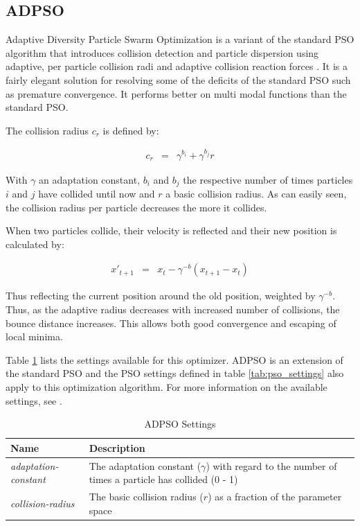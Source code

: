 \documentclass{report}
\begin{document}
\subsection{ADPSO}
Adaptive Diversity Particle Swarm Optimization is a variant of the standard
PSO algorithm that introduces collision detection and particle dispersion
using adaptive, per particle collision radi and adaptive collision reaction
forces \cite{monson_ad_2006}. It is a fairly elegant solution for resolving
some of the deficits of the standard PSO such as premature convergence. It
performs better on multi modal functions than the standard PSO.

The collision radius $c_r$ is defined by:

\begin{eqnarray*}
	c_r & = & \gamma^{b_i} + \gamma^{b_j} r
\end{eqnarray*}

With $\gamma$ an adaptation constant, $b_i$ and $b_j$ the respective number
of times particles $i$ and $j$ have collided until now and $r$ a basic collision
radius. As can easily seen, the collision radius per particle decreases
the more it collides.

When two particles collide, their velocity is reflected and their new position
is calculated by:

\begin{eqnarray*}
	x'_{t + 1} & = & x_t - \gamma^{-b}(x_{t + 1} - x_{t})
\end{eqnarray*}

Thus reflecting the current position around the old position, weighted by
$\gamma^{-b}$. Thus, as the adaptive radius decreases with increased number
of collisions, the bounce distance increases. This allows both good convergence
and escaping of local minima.

Table \ref{tab:adpso_settings} lists the settings available for this optimizer.
ADPSO is an extension of the standard PSO and the PSO settings defined in
table \ref{tab:pso_settings} also apply to this optimization algorithm. For
more information on the available settings, see .

\begin{table}[h!tb]\caption{ADPSO Settings}\label{tab:adpso_settings}\vspace{0.1in}
	\centering

	\begin{tabular}{p{4cm} p{12cm}}
		\toprule
		\textbf{Name} & \textbf{Description} \\
		\midrule
		\textit{adaptation-constant} & The adaptation constant ($\gamma$) with regard to the number
		                      of times a particle has collided (0 - 1) \\
		\textit{collision-radius} & The basic collision radius ($r$) as a fraction of the
		                   parameter space \\
		\bottomrule
	\end{tabular}
\end{table}
\end{document}
